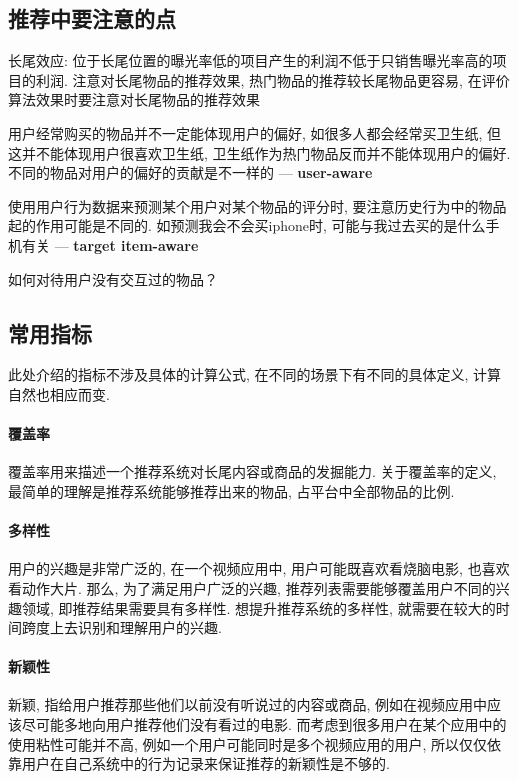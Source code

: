 \subsection{推荐中要注意的点}
\begin{myitemize}
	\item 长尾效应: 位于长尾位置的曝光率低的项目产生的利润不低于只销售曝光率高的项目的利润. 注意对长尾物品的推荐效果, 热门物品的推荐较长尾物品更容易, 在评价算法效果时要注意对长尾物品的推荐效果
	\item 用户经常购买的物品并不一定能体现用户的偏好, 如很多人都会经常买卫生纸, 但这并不能体现用户很喜欢卫生纸, 卫生纸作为热门物品反而并不能体现用户的偏好. 不同的物品对用户的偏好的贡献是不一样的 --- \textbf{user-aware}
	\item 使用用户行为数据来预测某个用户对某个物品的评分时, 要注意历史行为中的物品起的作用可能是不同的\cite{he2018nais}. 如预测我会不会买iphone时, 可能与我过去买的是什么手机有关 --- \textbf{target item-aware}
	\item 如何对待用户没有交互过的物品？
\end{myitemize}

\subsection{常用指标}
此处介绍的指标不涉及具体的计算公式, 在不同的场景下有不同的具体定义, 计算自然也相应而变. 
\paragraph{覆盖率}覆盖率用来描述一个推荐系统对长尾内容或商品的发掘能力. 关于覆盖率的定义, 最简单的理解是推荐系统能够推荐出来的物品, 占平台中全部物品的比例. 

\paragraph{多样性}用户的兴趣是非常广泛的, 在一个视频应用中, 用户可能既喜欢看烧脑电影, 也喜欢看动作大片. 那么, 为了满足用户广泛的兴趣, 推荐列表需要能够覆盖用户不同的兴趣领域, 即推荐结果需要具有多样性. 想提升推荐系统的多样性, 就需要在较大的时间跨度上去识别和理解用户的兴趣. 

\paragraph{新颖性}新颖, 指给用户推荐那些他们以前没有听说过的内容或商品, 例如在视频应用中应该尽可能多地向用户推荐他们没有看过的电影. 而考虑到很多用户在某个应用中的使用粘性可能并不高, 例如一个用户可能同时是多个视频应用的用户, 所以仅仅依靠用户在自己系统中的行为记录来保证推荐的新颖性是不够的. 


